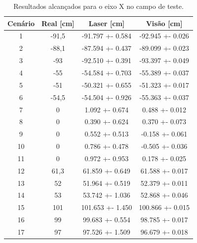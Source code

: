 \documentclass[acronym, symbols, table, deposito]{fei}
\begin{document}
				\begin{table}[!htb]
					\centering
					\caption{Resultados alcançados para o eixo X no campo de teste.}
					\label{tbl:general_results_x}
					\begin{tabular}{|c|
							>{\columncolor[HTML]{FBE2D5}}c |
							>{\columncolor[HTML]{FBE2D5}}c |
							>{\columncolor[HTML]{FBE2D5}}c |}
						\hline
						Cenário                    & Real {[}cm{]}   & Laser {[}cm{]}   & Visão {[}cm{]}   \\ \hline
						\cellcolor[HTML]{FFFFFF}1  & -91,5           & -91.797 +- 0.584 & -92.945 +- 0.026 \\ \hline
						\cellcolor[HTML]{FFFFFF}2  & -88,1           & -87.594 +- 0.437 & -89.099 +- 0.023 \\ \hline
						\cellcolor[HTML]{FFFFFF}3  & -93             & -92.510 +- 0.391 & -93.397 +- 0.049 \\ \hline
						\cellcolor[HTML]{FFFFFF}4  & -55             & -54.584 +- 0.703 & -55.389 +- 0.037 \\ \hline
						\cellcolor[HTML]{FFFFFF}5  & -51             & -50.321 +- 0.655 & -51.323 +- 0.017 \\ \hline
						\cellcolor[HTML]{FFFFFF}6  & -54,5           & -54.504 +- 0.926 & -55.363 +- 0.037 \\ \hline
						\cellcolor[HTML]{FFFFFF}7  & 0               & 1.092 +- 0.674   & 0.488 +- 0.012   \\ \hline
						\cellcolor[HTML]{FFFFFF}8  & 0               & 0.390 +- 0.624   & 0.370 +- 0.073   \\ \hline
						\cellcolor[HTML]{FFFFFF}9  & 0               & 0.552 +- 0.513   & -0.158 +- 0.061  \\ \hline
						\cellcolor[HTML]{FFFFFF}10 & 0               & 0.786 +- 0.478   & -0.505 +- 0.036  \\ \hline
						\cellcolor[HTML]{FFFFFF}11 & 0               & 0.972 +- 0.953   & 0.178 +- 0.025   \\ \hline
						\cellcolor[HTML]{FFFFFF}12 & 61,3            & 61.859 +- 0.649  & 61.588 +- 0.017  \\ \hline
						\cellcolor[HTML]{FFFFFF}13 & 52              & 51.964 +- 0.519  & 52.379 +- 0.011  \\ \hline
						\cellcolor[HTML]{FFFFFF}14 & 53              & 53.742 +- 1.036  & 52.868 +- 0.046  \\ \hline
						\cellcolor[HTML]{FFFFFF}15 & 101             & 101.653 +- 1.450 & 100.866 +- 0.015 \\ \hline
						\cellcolor[HTML]{FFFFFF}16 & 99              & 99.683 +- 0.554  & 98.785 +- 0.017  \\ \hline
						\cellcolor[HTML]{FFFFFF}17 & 97              & 97.526 +- 1.509  & 96.679 +- 0.018  \\ \hline
					\end{tabular}
				\end{table}
			
\end{document}
